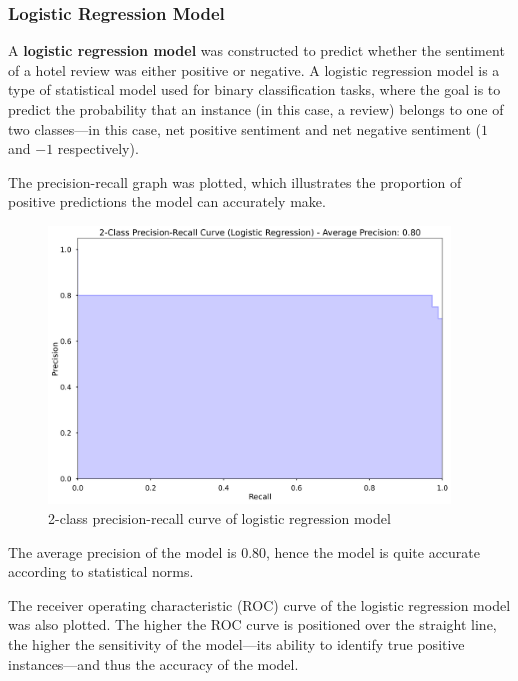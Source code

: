 \documentclass[12pt, bibliography=totocnumbered, paper=a4]{scrartcl}
\def\bf#1{\textbf{#1}}
\begin{document}
\subsubsection{Logistic Regression Model}
A \bf{logistic regression model} was constructed to predict whether the sentiment
of a hotel review was either positive or negative. A logistic regression model
is a type of statistical model used for binary classification tasks, where the goal
is to predict the probability that an instance (in this case, a review) belongs to one of two classes---in
this case, net positive sentiment and net negative sentiment (\(1\) and \(-1\) respectively).

The precision-recall graph was plotted, which illustrates the proportion of positive
predictions the model can accurately make.

\begin{figure}[htpb]
	\begin{center}
		\includegraphics[width=0.95\textwidth]{rq3/prec-recall_logreg.png}
	\end{center}
	\caption{2-class precision-recall curve of logistic regression model}
	\label{fig:lg-prcurve}
\end{figure}

The average precision of the model is \num{0.80}, hence the model is quite accurate
according to statistical norms.

The receiver operating characteristic (ROC) curve of the logistic regression model
was also plotted. The higher the ROC curve is positioned over the straight line, the higher
the sensitivity of the model---its ability to identify true positive instances---and
thus the accuracy of the model.
\end{document}
